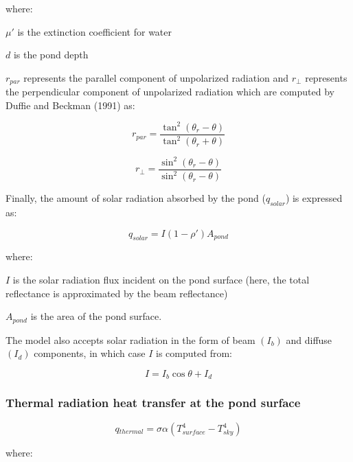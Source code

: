 where:

\(\mu '\) is the extinction coefficient for water

\(d\) is the pond depth

\({r_{par}}\) represents the parallel component of unpolarized radiation and \({r_ \bot }\) represents the perpendicular component of unpolarized radiation which are computed by Duffie and Beckman (1991) as:

\begin{equation}
  r_{par} = \frac{\tan ^2 \left( \theta_r - \theta \right)}{\tan ^2 \left( \theta_r + \theta \right)}
\end{equation}

\begin{equation}
  r_{\bot} = \frac{\sin ^2 \left( \theta_r - \theta \right)}{\sin ^2 \left( \theta_r - \theta  \right)}
\end{equation}

Finally, the amount of solar radiation absorbed by the pond (\({q_{solar}}\)) is expressed as:

\begin{equation}
{q_{solar}} = I\left( {1 - \rho '} \right){A_{pond}}
\end{equation}

where:

\(I\) is the solar radiation flux incident on the pond surface (here, the total reflectance is approximated by the beam reflectance)

\({A_{pond}}\) is the area of the pond surface.

The model also accepts solar radiation in the form of beam \(\left( {{I_b}} \right)\) and diffuse \(\left( {{I_d}} \right)\) components, in which case \(I\) is computed from:

\begin{equation}
I = {I_b}\cos \theta  + {I_d}
\end{equation}

\subsubsection{Thermal radiation heat transfer at the pond surface}\label{thermal-radiation-heat-transfer-at-the-pond-surface}

\begin{equation}
q{}_{thermal} = \sigma \alpha (T{{}_{surface}^4} - T{{}_{sky}^4})
\end{equation}

where:

